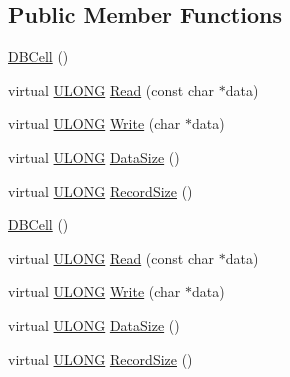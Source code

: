 \subsection*{Public Member Functions}
\begin{DoxyCompactItemize}
\item 
\hyperlink{struct_y_excel_1_1_worksheet_1_1_cell_table_1_1_row_block_1_1_d_b_cell_a80b5983647428062f0cba6d18713cc56}{D\+B\+Cell} ()
\item 
virtual \hyperlink{_basic_excel_8hpp_abe09d1bea023be6a07cbadde8e955435}{U\+L\+O\+N\+G} \hyperlink{struct_y_excel_1_1_worksheet_1_1_cell_table_1_1_row_block_1_1_d_b_cell_a2303abf94d899223bdb52734afe9b003}{Read} (const char $\ast$data)
\item 
virtual \hyperlink{_basic_excel_8hpp_abe09d1bea023be6a07cbadde8e955435}{U\+L\+O\+N\+G} \hyperlink{struct_y_excel_1_1_worksheet_1_1_cell_table_1_1_row_block_1_1_d_b_cell_a099ce148ff5ebe7d7e89af25240887c5}{Write} (char $\ast$data)
\item 
virtual \hyperlink{_basic_excel_8hpp_abe09d1bea023be6a07cbadde8e955435}{U\+L\+O\+N\+G} \hyperlink{struct_y_excel_1_1_worksheet_1_1_cell_table_1_1_row_block_1_1_d_b_cell_a440adc710bc74edf1e323495d46195a7}{Data\+Size} ()
\item 
virtual \hyperlink{_basic_excel_8hpp_abe09d1bea023be6a07cbadde8e955435}{U\+L\+O\+N\+G} \hyperlink{struct_y_excel_1_1_worksheet_1_1_cell_table_1_1_row_block_1_1_d_b_cell_a8a6a496abcba94f8b9a610ced814b78d}{Record\+Size} ()
\item 
\hyperlink{struct_y_excel_1_1_worksheet_1_1_cell_table_1_1_row_block_1_1_d_b_cell_a80b5983647428062f0cba6d18713cc56}{D\+B\+Cell} ()
\item 
virtual \hyperlink{_basic_excel_8hpp_abe09d1bea023be6a07cbadde8e955435}{U\+L\+O\+N\+G} \hyperlink{struct_y_excel_1_1_worksheet_1_1_cell_table_1_1_row_block_1_1_d_b_cell_afb0e53663a041c0b29a5287966f8720b}{Read} (const char $\ast$data)
\item 
virtual \hyperlink{_basic_excel_8hpp_abe09d1bea023be6a07cbadde8e955435}{U\+L\+O\+N\+G} \hyperlink{struct_y_excel_1_1_worksheet_1_1_cell_table_1_1_row_block_1_1_d_b_cell_a47416984ae766f49fe2a501b75edb696}{Write} (char $\ast$data)
\item 
virtual \hyperlink{_basic_excel_8hpp_abe09d1bea023be6a07cbadde8e955435}{U\+L\+O\+N\+G} \hyperlink{struct_y_excel_1_1_worksheet_1_1_cell_table_1_1_row_block_1_1_d_b_cell_a243516d2e4bbfaa2d4ebd5a0ae25d4c5}{Data\+Size} ()
\item 
virtual \hyperlink{_basic_excel_8hpp_abe09d1bea023be6a07cbadde8e955435}{U\+L\+O\+N\+G} \hyperlink{struct_y_excel_1_1_worksheet_1_1_cell_table_1_1_row_block_1_1_d_b_cell_ad9cb0ae5796b6ad9dc49e8275caf2fdf}{Record\+Size} ()

\end{DoxyCompactItemize}
